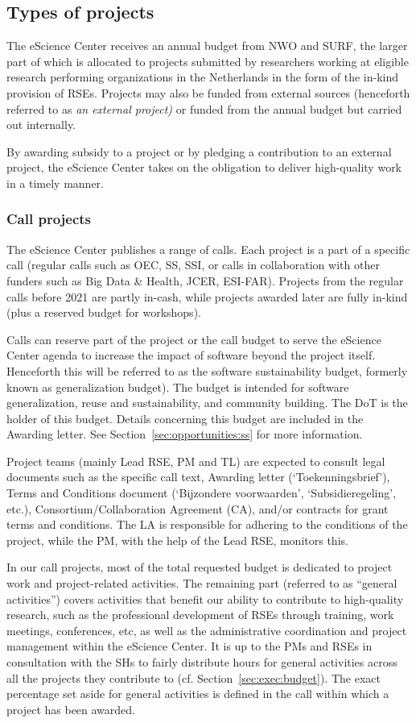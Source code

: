 \subsection{Types of projects}
The eScience Center receives an annual budget from NWO and SURF, the larger part of which is allocated to projects
submitted by researchers working at eligible research performing organizations in the Netherlands in the form of the
in-kind provision of RSEs. Projects may also be funded from external sources (henceforth referred to as \textit{an
external project) }or funded from the annual budget but carried out internally.

By awarding subsidy to a project or by pledging a contribution to an external project, the eScience Center takes on the
obligation to deliver high-quality work in a timely manner.

\subsubsection{Call projects}
The eScience Center publishes a range of calls. Each project is a part of a specific call (regular calls such as
OEC, SS, SSI, or calls in collaboration with other funders such as Big Data \& Health, 
JCER, ESI-FAR). Projects from the regular calls before 2021 are partly in-cash, while projects awarded later
are fully in-kind (plus a reserved budget for workshops).

Calls can reserve part of the project or the call budget to serve the eScience Center agenda to increase the impact of
software beyond the project itself. Henceforth this will be referred to as the software sustainability budget, formerly
known as generalization budget). The budget is intended for software generalization, reuse and sustainability, and
community building. The DoT is the holder of this budget. Details concerning this budget are included in the Awarding
letter. See Section~\ref{sec:opportunities:ss} for more information.

Project teams (mainly Lead RSE, PM and TL) are expected to consult legal documents such as the specific call text, Awarding letter
(‘Toekenningsbrief’), Terms and Conditions document (‘Bijzondere voorwaarden’, ‘Subsidieregeling’, etc.), Consortium/Collaboration Agreement (CA), and/or
contracts for grant terms and conditions. The LA is responsible for adhering to the conditions of the project, while
the PM, with the help of the Lead RSE, monitors this.

In our call projects, most of the total requested budget is dedicated to project work and project-related activities.
The remaining part (referred to as “general activities”) covers activities that benefit our ability to contribute to
high-quality research, such as the professional development of RSEs through training, work meetings, conferences, etc,
as well as the administrative coordination and project management within the eScience Center. It is up to the PMs and
RSEs in consultation with the SHs to fairly distribute hours for general activities across all the projects they
contribute to (cf. Section~\ref{sec:exec:budget}). The exact percentage set aside for general activities is defined in
the call within which a project has been awarded.

